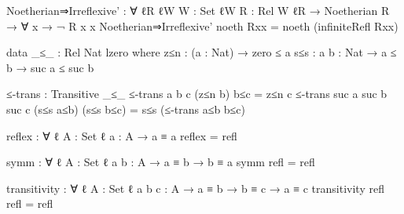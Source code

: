 \begin{spverbatim}
Noetherian⇒Irreflexive' : ∀ {ℓR ℓW} {W : Set ℓW} {R : Rel W ℓR} → Noetherian R → ∀ {x} → ¬ R x x
Noetherian⇒Irreflexive' noeth Rxx = noeth (infiniteRefl Rxx)

data _≤_ : Rel Nat lzero where
  z≤n : (a : Nat) → zero ≤ a
  s≤s : {a b : Nat} → a ≤ b → suc a ≤ suc b

≤-trans : Transitive _≤_
≤-trans {a} {b} {c} (z≤n b) b≤c = z≤n c
≤-trans {suc a} {suc b} {suc c} (s≤s a≤b) (s≤s b≤c) = s≤s (≤-trans a≤b b≤c)

reflex : ∀ {ℓ} {A : Set ℓ} {a : A} → a ≡ a
reflex = refl

symm : ∀ {ℓ} {A : Set ℓ} {a b : A} → a ≡ b → b ≡ a
symm refl = refl

transitivity : ∀ {ℓ} {A : Set ℓ} {a b c : A} → a ≡ b → b ≡ c → a ≡ c
transitivity refl refl = refl
\end{spverbatim}
